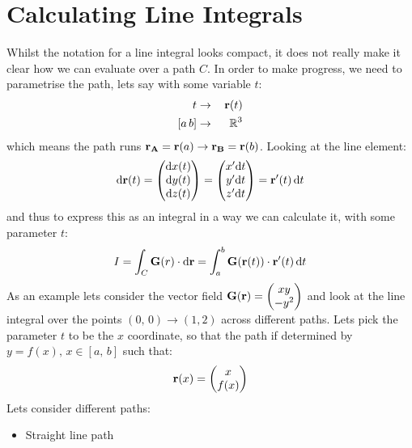 \documentclass[letterpaper,10pt,english]{jupyterBook}
\begin{document}
\section{Calculating Line Integrals}
\label{\detokenize{VectorCalculus/lineintegrals:calculating-line-integrals}}
\sphinxAtStartPar
Whilst the notation for a line integral looks compact, it does not really make it clear how we can evaluate over a path \(C\).  In order to make progress,
we need to parametrise the path, lets say with some variable \(t\):
\begin{equation*}
\begin{split}t &\rightarrow&\, {\bf r}(t) \\
[a\, b] &\rightarrow&\, \mathbb{R}^3\end{split}
\end{equation*}
\sphinxAtStartPar
which means the path runs \({\bf r_A} = {\bf r}(a) \rightarrow {\bf r_B} = {\bf r}(b)\).  Looking at the line element:
\begin{equation*}
\begin{split}\mathrm{d}{\bf r}(t) = \begin{pmatrix} \mathrm{d}x (t) \\ \mathrm{d}y (t) \\\mathrm{d}z (t)\end{pmatrix} = 
\begin{pmatrix} x'\mathrm{d}t \\ y'\mathrm{d}t \\ z'\mathrm{d}t\end{pmatrix} = {\bf r}'(t)\,\mathrm{d} t\end{split}
\end{equation*}
\sphinxAtStartPar
and thus to express this as an integral in a way we can calculate it, with some parameter \(t\):
\begin{equation*}
\begin{split}I = \int_C {\bf G}(r) \cdot \mathrm{d}{\bf r} = \int_a^b {\bf G}({\bf r}(t)) \cdot {\bf r}'(t)\,\mathrm{d}t
\end{split}
\end{equation*}
\sphinxAtStartPar
As an example lets consider the vector field \({\bf G(r)} = \begin{pmatrix} xy\\ -y^2 \end{pmatrix}\) and look at the line integral over the points
\((0,\, 0) \rightarrow (1,2)\) across different paths.  Lets pick the parameter \(t\) to be the \(x\) coordinate, so that the path if determined by
\(y = f(x), \, x \in [a,\, b]\) such that:
\begin{equation*}
\begin{split}{\bf r}(x) = \begin{pmatrix} x \\ f(x) \end{pmatrix}\end{split}
\end{equation*}
\sphinxAtStartPar
Lets consider different paths:
\begin{itemize}
\item {} 
\sphinxAtStartPar
Straight line path

\end{itemize}
\end{document}
